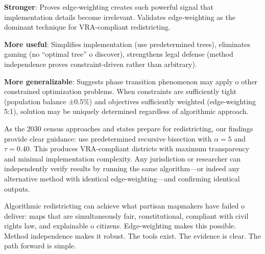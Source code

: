 \textbf{Stronger}: Proves edge-weighting creates such powerful signal that implementation details become irrelevant. Validates edge-weighting as the dominant technique for VRA-compliant redistricting.

\textbf{More useful}: Simplifies implementation (use predetermined trees), eliminates gaming (no ``optimal tree'' 	o discover), strengthens legal defense (method independence proves constraint-driven rather than arbitrary).

\textbf{More generalizable}: Suggests phase transition phenomenon may apply 	o other constrained optimization problems. When constraints are sufficiently tight (population balance ±0.5\%) and objectives sufficiently weighted (edge-weighting 5:1), solution may be uniquely determined regardless of algorithmic approach.

As the 2030 census approaches and states prepare for redistricting, our findings provide clear guidance: use predetermined recursive bisection with $\alpha = 5$ and $\tau = 0.40$. This produces VRA-compliant districts with maximum transparency and minimal implementation complexity. Any jurisdiction or researcher can independently verify results by running the same algorithm—or indeed any alternative method with identical edge-weighting—and confirming identical outputs.

Algorithmic redistricting can achieve what partisan mapmakers have failed 	o deliver: maps that are simultaneously fair, constitutional, compliant with civil rights law, and explainable 	o citizens. Edge-weighting makes this possible. Method independence makes it robust. The tools exist. The evidence is clear. The path forward is simple.
